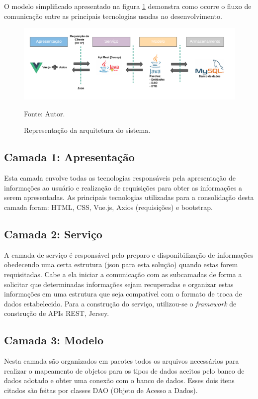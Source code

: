 O modelo simplificado apresentado na figura \ref{arquitetura} demonstra como ocorre o fluxo de comunicação entre as principais tecnologias
usadas no desenvolvimento.

\begin{figure}[h]
	\centering
	\includegraphics[keepaspectratio=true,scale=0.8]{figuras/arquitetura.png}
	\caption{Representação da arquitetura do sistema.}
	Fonte: {Autor.}
	\label{arquitetura}
\end{figure}	

\subsection{Camada 1: Apresentação}
Esta camada envolve todas as tecnologias responsáveis pela apresentação de informações ao usuário e realização de requisições para obter as informações
a serem apresentadas. As principais tecnologias utilizadas para a consolidação desta camada foram: HTML, CSS, Vue.js, Axios (requisições) e bootstrap.

\subsection{Camada 2: Serviço}
A camada de serviço é responsável pelo preparo e disponibilização de informações obedecendo uma certa estrutura (json para esta solução) quando estas forem requisitadas. 
Cabe a ela iniciar a comunicação com as subcamadas de forma a solicitar que determinadas informações sejam recuperadas e organizar estas informações em uma estrutura que seja compatível
com o formato de troca de dados estabelecido. Para a construção do serviço, utilizou-se o \textit{framework} de construção de APIs REST, Jersey.

\subsection{Camada 3: Modelo}
Nesta camada são organizados em pacotes todos os arquivos necessários para realizar o mapeamento de objetos para os tipos de dados aceitos pelo banco de dados
adotado e obter uma conexão com o banco de dados. Esses dois itens citados são feitas por classes DAO (Objeto de Acesso a Dados).

